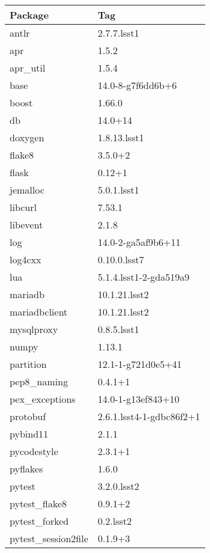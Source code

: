\documentclass[DM,toc]{lsstdoc}
\begin{document}
\begin{table}[h]
\centering
\begin{tabular}{l l}
Package & Tag \\ \hline
antlr              &   2.7.7.lsst1  \\
apr                &   1.5.2       \\
apr\_util           &   1.5.4       \\
base               &   14.0-8-g7f6dd6b+6  \\
boost              &   1.66.0      \\
db                 &   14.0+14     \\
doxygen            &   1.8.13.lsst1  \\
flake8             &   3.5.0+2     \\
flask              &   0.12+1      \\
jemalloc           &   5.0.1.lsst1  \\
libcurl            &   7.53.1      \\
libevent           &   2.1.8       \\
log                &   14.0-2-ga5af9b6+11  \\
log4cxx            &   0.10.0.lsst7  \\
lua                &   5.1.4.lsst1-2-gda519a9  \\
mariadb            &   10.1.21.lsst2  \\
mariadbclient      &   10.1.21.lsst2  \\
mysqlproxy         &   0.8.5.lsst1  \\
numpy              &   1.13.1      \\
partition          &   12.1-1-g721d0e5+41  \\
pep8\_naming        &   0.4.1+1     \\
pex\_exceptions     &   14.0-1-g13ef843+10  \\
protobuf           &   2.6.1.lsst4-1-gdbc86f2+1  \\
pybind11           &   2.1.1       \\
pycodestyle        &   2.3.1+1     \\
pyflakes           &   1.6.0       \\
pytest             &   3.2.0.lsst2  \\
pytest\_flake8      &   0.9.1+2     \\
pytest\_forked      &   0.2.lsst2   \\
pytest\_session2file &  0.1.9+3     \\

\end{tabular}
\end{table}
\end{document}
